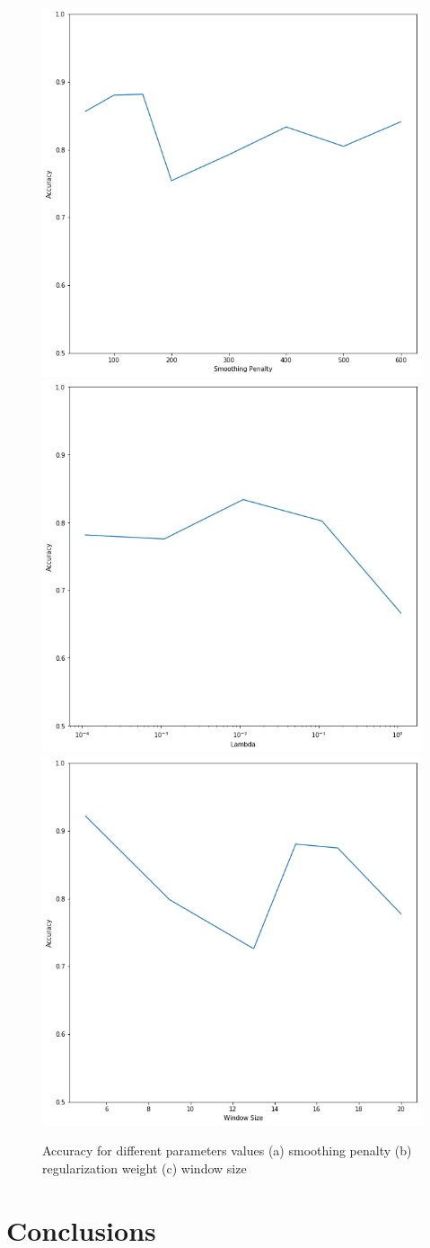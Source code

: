 \documentclass{llncs}
\begin{document}
\begin{figure}[H]
    \centering
    \includegraphics[width=.3\textwidth]{PenaltyLine.png}\hfill
    \includegraphics[width=.3\textwidth]{lambdaLine.png}\hfill
    \includegraphics[width=.3\textwidth]{windowLine.png}
    \caption{Accuracy for different parameters values (a) smoothing penalty (b) regularization weight (c) window size}
    \label{fig:line}
\end{figure}

\section{Conclusions}


%
%



\end{document}
